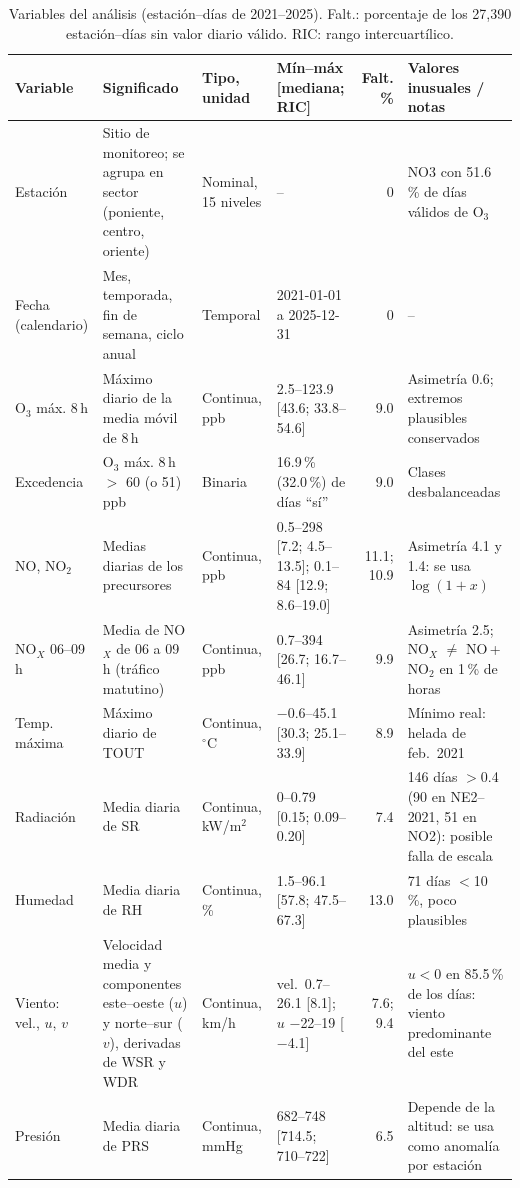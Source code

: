 \documentclass[11pt,letterpaper]{article}
\newcommand{\Othree}{O$_3$}
\newcommand{\NOx}{NO$_X$}
\begin{document}
\begin{table}[h]
\centering
\footnotesize
\renewcommand{\arraystretch}{1.03}
\setlength{\tabcolsep}{4pt}
\begin{tabular}{@{}P{2.2cm}P{3.4cm}P{1.6cm}P{3.3cm}r P{3.1cm}@{}}
\toprule
Variable & Significado & Tipo, unidad & M\'in--m\'ax [mediana; RIC] & Falt. \% & Valores inusuales / notas \\
\midrule
Estaci\'on & Sitio de monitoreo; se agrupa en sector (poniente, centro, oriente) & Nominal, 15 niveles & -- & 0 & NO3 con 51.6\,\% de d\'ias v\'alidos de \Othree{} \\
Fecha (calendario) & Mes, temporada, fin de semana, ciclo anual & Temporal & 2021-01-01 a 2025-12-31 & 0 & -- \\
\Othree{} m\'ax. 8\,h & M\'aximo diario de la media m\'ovil de 8\,h & Continua, ppb & 2.5--123.9 [43.6; 33.8--54.6] & 9.0 & Asimetr\'ia 0.6; extremos plausibles conservados \\
Excedencia & \Othree{} m\'ax. 8\,h $>$ 60 (o 51) ppb & Binaria & 16.9\,\% (32.0\,\%) de d\'ias ``s\'i'' & 9.0 & Clases desbalanceadas \\
NO, NO$_2$ & Medias diarias de los precursores & Continua, ppb & 0.5--298 [7.2; 4.5--13.5]; 0.1--84 [12.9; 8.6--19.0] & 11.1; 10.9 & Asimetr\'ia 4.1 y 1.4: se usa $\log(1+x)$ \\
\NOx{} 06--09\,h & Media de \NOx{} de 06 a 09\,h (tr\'afico matutino) & Continua, ppb & 0.7--394 [26.7; 16.7--46.1] & 9.9 & Asimetr\'ia 2.5; \NOx{} $\neq$ NO\,+\,NO$_2$ en 1\,\% de horas \\
Temp. m\'axima & M\'aximo diario de TOUT & Continua, $^\circ$C & $-$0.6--45.1 [30.3; 25.1--33.9] & 8.9 & M\'inimo real: helada de feb.\ 2021 \\
Radiaci\'on & Media diaria de SR & Continua, kW/m$^2$ & 0--0.79 [0.15; 0.09--0.20] & 7.4 & 146 d\'ias $>$0.4 (90 en NE2--2021, 51 en NO2): posible falla de escala \\
Humedad & Media diaria de RH & Continua, \% & 1.5--96.1 [57.8; 47.5--67.3] & 13.0 & 71 d\'ias $<$10\,\%, poco plausibles \\
Viento: vel., $u$, $v$ & Velocidad media y componentes este--oeste ($u$) y norte--sur ($v$), derivadas de WSR y WDR & Continua, km/h & vel.\ 0.7--26.1 [8.1]; $u$ $-$22--19 [$-$4.1] & 7.6; 9.4 & $u<0$ en 85.5\,\% de los d\'ias: viento predominante del este \\
Presi\'on & Media diaria de PRS & Continua, mmHg & 682--748 [714.5; 710--722] & 6.5 & Depende de la altitud: se usa como anomal\'ia por estaci\'on \\
\bottomrule
\end{tabular}
\caption{Variables del an\'alisis (estaci\'on--d\'ias de 2021--2025). Falt.: porcentaje de los 27,390 estaci\'on--d\'ias sin valor diario v\'alido. RIC: rango intercuart\'ilico.}
\label{tab:vars}
\end{table}
\end{document}
